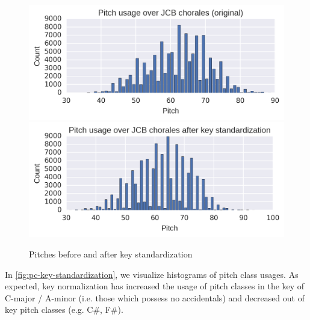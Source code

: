 \begin{figure}[tb]
    \centering
    \includegraphics[width=1.0\linewidth]{pitch-usage-original.png}
    \includegraphics[width=1.0\linewidth]{pitch-usage-preproc.png}
    \caption{Pitches before and after key standardization}
    \label{fig:pitch-key-standardization}
\end{figure}

In \cref{fig:pc-key-standardization}, we visualize histograms of pitch class usages.
As expected, key normalization has increased the usage of pitch classes in the key of
C-major / A-minor (i.e. those which possess no accidentals) and decreased out of key
pitch classes (e.g. C\#, F\#).

